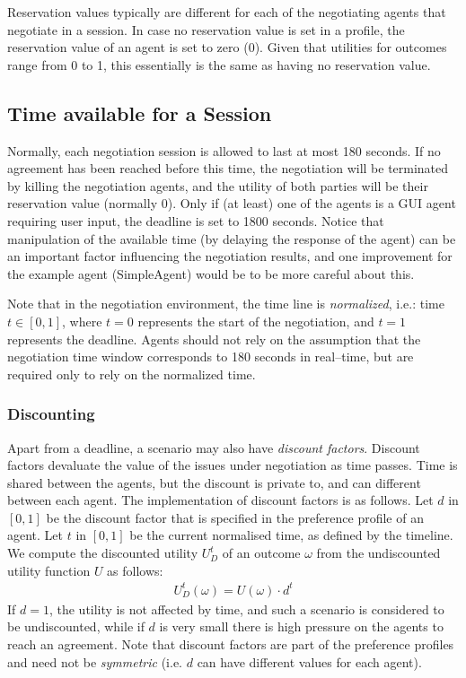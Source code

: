 \documentclass[]{article}
\begin{document}
Reservation values typically are different for each of the negotiating agents that negotiate in a session. In case no reservation value is set in a profile, the reservation value of an agent is set to zero (0). Given that utilities for outcomes range from 0 to 1, this essentially is the same as having no reservation value.


\subsection{Time available for a Session}

Normally, each negotiation session is allowed to last at most 180 seconds. If no agreement has been reached before this time, the negotiation will be terminated by killing the negotiation agents, and the utility of both parties will be their reservation value (normally 0). Only if (at least) one of the agents is a GUI agent requiring user input, the deadline is set to 1800 seconds. Notice that manipulation of the available time (by delaying the response of the agent) can be an important factor influencing the negotiation results, and one improvement for the example agent (SimpleAgent) would be to be more careful about this.

Note that in the negotiation environment, the time line is \emph{normalized}, i.e.: time $t \in [0, 1]$, where $t = 0$ represents the start of the negotiation, and $t = 1$ represents the deadline. Agents should not rely on the assumption that the negotiation time window corresponds to 180 seconds in real--time, but are required only to rely on the normalized time. 

\subsubsection{Discounting}
Apart from a deadline, a scenario may also have \emph{discount factors}. Discount factors devaluate the value of the issues under negotiation as time passes. Time is shared between the agents, but the discount is private to, and can different between each agent. The implementation of discount factors is as follows. Let $d$ in $[0, 1]$ be the discount factor that is specified in the preference profile of an agent. Let $t$ in $[0, 1]$ be the current normalised time, as defined by the timeline. We compute the discounted utility $U_D^t$ of an outcome $\omega$ from the undiscounted utility function $U$ as follows:
\begin{eqnarray}
U_D^t(\omega) = U(\omega) \cdot d^t
\end{eqnarray}
If $d = 1$, the utility is not affected by time, and such a scenario is considered to be undiscounted, while if $d$ is very small there is high pressure on the agents to reach an agreement. Note that discount factors are part of the preference profiles and need not be \emph{symmetric} (i.e. $d$ can have different values for each agent).
\end{document}
